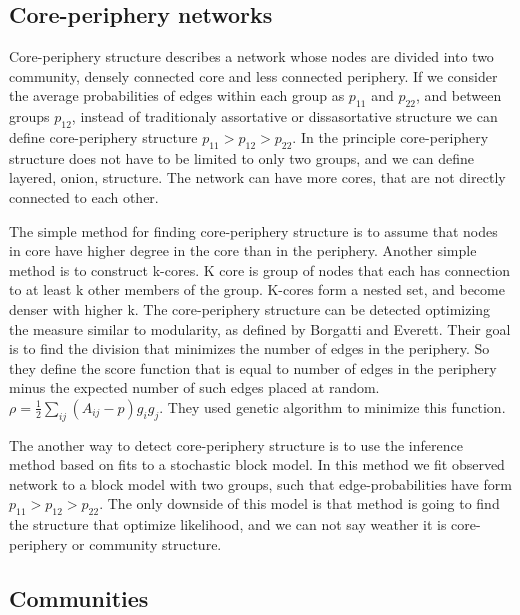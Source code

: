 \subsection{Core-periphery networks}

Core-periphery structure describes a network whose nodes are divided into two community, densely connected core and less connected periphery. If we consider the average probabilities of edges within each group as $p_{11}$ and $p_{22}$, and between groups $p_{12}$, instead of traditionaly assortative or dissasortative structure we can define core-periphery structure $p_{11}> p_{12} > p_{22}$. In the principle core-periphery structure does not have to be limited to only two groups, and we can define layered, onion, structure. The network can have more cores, that are not directly connected to each other. 

The simple method for finding core-periphery structure is to assume that nodes in core have higher degree in the core than in the periphery. Another simple method is to construct k-cores. K core is group of nodes that each has connection to at least k other members of the group. K-cores form a nested set, and become denser with higher k. The core-periphery structure can be detected optimizing the measure similar to modularity, as defined by Borgatti and Everett. Their goal is to find the division that minimizes the number of edges in the periphery. So they define the score function that is equal to number of edges in the periphery minus the expected number of such edges placed at random. $\rho = \frac{1}{2}\sum_{ij}(A_{ij}-p)g_ig_j$. They used genetic algorithm to minimize this function. 

The another way to detect core-periphery structure is to use the inference method based on fits to a stochastic block model. In this method we fit observed network to a block model with two groups, such that edge-probabilities have form $p_{11}> p_{12} > p_{22}$. The only downside of this model is that method is going to find the structure that optimize likelihood, and we can not say weather it is core-periphery or community structure. 


\subsection{Communities}

